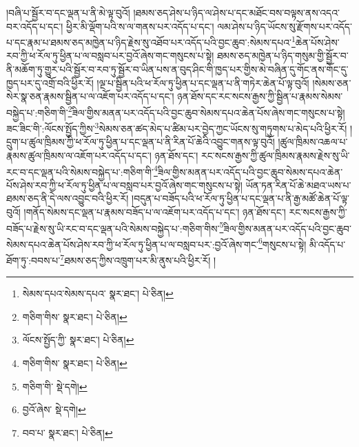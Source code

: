 །བཞི་པ་སྦྱོར་བ་དང་ལྡན་པ་ནི་མེ་ལྟ་བུའོ། །ཐམས་ཅད་ཤེས་པ་ཉིད་ལ་ཤེས་པ་དང་མཐོང་བས་བལྟས་ནས་འདའ་བར་འདོད་པ་དང་། ཕྱིར་མི་ལྡོག་པའི་ས་ལ་གནས་པར་འདོད་པ་དང་། ལམ་ཤེས་པ་ཉིད་ཡོངས་སུ་རྫོགས་པར་འདོད་པ་དང་རྣམ་པ་ཐམས་ཅད་མཁྱེན་པ་ཉིད་རྗེས་སུ་འཐོབ་པར་འདོད་པའི་བྱང་ཆུབ་:སེམས་དཔའ་\footnote{སེམས་དཔའ་སེམས་དཔའ་  སྣར་ཐང་།  པེ་ཅིན། }ཆེན་པོས་ཤེས་རབ་ཀྱི་ཕ་རོལ་ཏུ་ཕྱིན་པ་ལ་བསླབ་པར་བྱའོ་ཞེས་གང་གསུངས་པ་སྟེ། ཐམས་ཅད་མཁྱེན་པ་ཉིད་གསུམ་གྱི་སྦྱོར་བ་ནི་མཆོག་ཏུ་གྱུར་པའི་སྦྱོར་བ་རབ་ཏུ་སྦྱོར་བ་ཡིན་པས་ན་བུད་ཤིང་གི་ཁྱད་པར་གྱིས་མེ་བཞིན་དུ་གོང་ནས་གོང་དུ་ཁྱད་པར་དུ་འགྲོ་བའི་ཕྱིར་རོ། །ལྔ་པ་སྦྱིན་པའི་ཕ་རོལ་ཏུ་ཕྱིན་པ་དང་ལྡན་པ་ནི་གཏེར་ཆེན་པོ་ལྟ་བུའོ། །སེམས་ཅན་སེར་སྣ་ཅན་རྣམས་སྦྱིན་པ་ལ་འཇོག་པར་འདོད་པ་དང་། ཉན་ཐོས་དང་རང་སངས་རྒྱས་ཀྱི་སྦྱིན་པ་རྣམས་སེམས་བསྐྱེད་པ་:གཅིག་གི་\footnote{གཅིག་གིས་  སྣར་ཐང་།  པེ་ཅིན། }ཟིལ་གྱིས་མནན་པར་འདོད་པའི་བྱང་ཆུབ་སེམས་དཔའ་ཆེན་པོས་ཞེས་གང་གསུངས་པ་སྟེ། ཟང་ཟིང་གི་:ལོངས་སྤྱོད་ཀྱིས་\footnote{ལོངས་སྤྱོད་ཀྱི་  སྣར་ཐང་།  པེ་ཅིན། }སེམས་ཅན་ཚད་མེད་པ་ཚིམ་པར་བྱེད་ཀྱང་ཡོངས་སུ་གཏུགས་པ་མེད་པའི་ཕྱིར་རོ། །དྲུག་པ་ཚུལ་ཁྲིམས་ཀྱི་ཕ་རོལ་ཏུ་ཕྱིན་པ་དང་ལྡན་པ་ནི་རིན་པོ་ཆེའི་འབྱུང་གནས་ལྟ་བུའོ། །ཚུལ་ཁྲིམས་འཆལ་པ་རྣམས་ཚུལ་ཁྲིམས་ལ་འཇོག་པར་འདོད་པ་དང་། ཉན་ཐོས་དང་། རང་སངས་རྒྱས་ཀྱི་ཚུལ་ཁྲིམས་རྣམས་རྗེས་སུ་ཡི་རང་བ་དང་ལྡན་པའི་སེམས་བསྐྱེད་པ་:གཅིག་གི་\footnote{གཅིག་གིས་  སྣར་ཐང་།  པེ་ཅིན། }ཟིལ་གྱིས་མནན་པར་འདོད་པའི་བྱང་ཆུབ་སེམས་དཔའ་ཆེན་པོས་ཤེས་རབ་ཀྱི་ཕ་རོལ་ཏུ་ཕྱིན་པ་ལ་བསླབ་པར་བྱའོ་ཞེས་གང་གསུངས་པ་སྟེ། ཡོན་ཏན་རིན་པོ་ཆེ་མཐའ་ཡས་པ་ཐམས་ཅད་ནི་དེ་ལས་འབྱུང་བའི་ཕྱིར་རོ། །བདུན་པ་བཟོད་པའི་ཕ་རོལ་ཏུ་ཕྱིན་པ་དང་ལྡན་པ་ནི་རྒྱ་མཚོ་ཆེན་པོ་ལྟ་བུའོ། །གནོད་སེམས་དང་ལྡན་པ་རྣམས་བཟོད་པ་ལ་འཇོག་པར་འདོད་པ་དང་། ཉན་ཐོས་དང་། རང་སངས་རྒྱས་ཀྱི་བཟོད་པ་རྗེས་སུ་ཡི་རང་བ་དང་ལྡན་པའི་སེམས་བསྐྱེད་པ་:གཅིག་གིས་\footnote{གཅིག་གི་  སྡེ་དགེ། }ཟིལ་གྱིས་མནན་པར་འདོད་པའི་བྱང་ཆུབ་སེམས་དཔའ་ཆེན་པོས་ཤེས་རབ་ཀྱི་ཕ་རོལ་ཏུ་ཕྱིན་པ་ལ་བསླབ་པར་:བྱའོ་ཞེས་གང་\footnote{བྱའོ་ཞེས་  སྡེ་དགེ། }གསུངས་པ་སྟེ། མི་འདོད་པ་ཐོག་ཏུ་:བབས་པ་\footnote{བབ་པ་  སྣར་ཐང་།  པེ་ཅིན། }ཐམས་ཅད་ཀྱིས་འཁྲུག་པར་མི་ནུས་པའི་ཕྱིར་རོ། །
